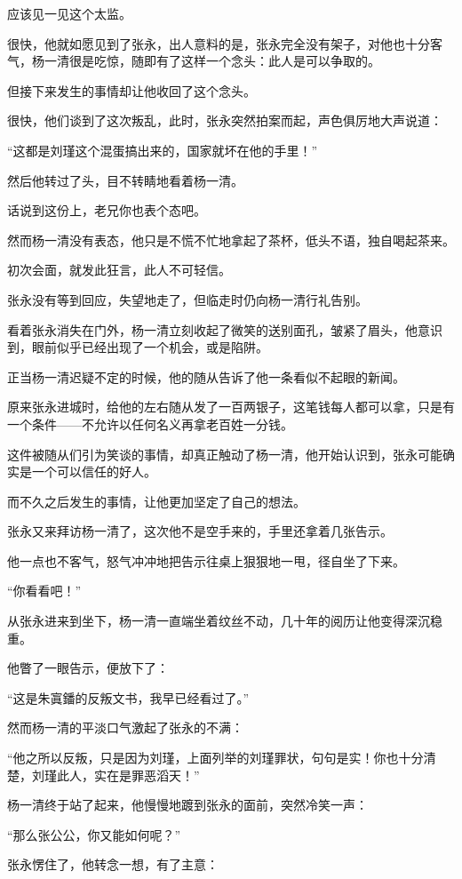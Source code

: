 \begin{multicols}{\theparacolNo}
		应该见一见这个太监。

		很快，他就如愿见到了张永，出人意料的是，张永完全没有架子，对他也十分客气，杨一清很是吃惊，随即有了这样一个念头：此人是可以争取的。

		但接下来发生的事情却让他收回了这个念头。

		很快，他们谈到了这次叛乱，此时，张永突然拍案而起，声色俱厉地大声说道：

		“这都是刘瑾这个混蛋搞出来的，国家就坏在他的手里！”

		然后他转过了头，目不转睛地看着杨一清。

		话说到这份上，老兄你也表个态吧。

		然而杨一清没有表态，他只是不慌不忙地拿起了茶杯，低头不语，独自喝起茶来。

		初次会面，就发此狂言，此人不可轻信。

		张永没有等到回应，失望地走了，但临走时仍向杨一清行礼告别。

		看着张永消失在门外，杨一清立刻收起了微笑的送别面孔，皱紧了眉头，他意识到，眼前似乎已经出现了一个机会，或是陷阱。

		正当杨一清迟疑不定的时候，他的随从告诉了他一条看似不起眼的新闻。

		原来张永进城时，给他的左右随从发了一百两银子，这笔钱每人都可以拿，只是有一个条件——不允许以任何名义再拿老百姓一分钱。

		这件被随从们引为笑谈的事情，却真正触动了杨一清，他开始认识到，张永可能确实是一个可以信任的好人。

		而不久之后发生的事情，让他更加坚定了自己的想法。

		张永又来拜访杨一清了，这次他不是空手来的，手里还拿着几张告示。

		他一点也不客气，怒气冲冲地把告示往桌上狠狠地一甩，径自坐了下来。

		“你看看吧！”

		从张永进来到坐下，杨一清一直端坐着纹丝不动，几十年的阅历让他变得深沉稳重。

		他瞥了一眼告示，便放下了：

		“这是朱寘鐇的反叛文书，我早已经看过了。”

		然而杨一清的平淡口气激起了张永的不满：

		“他之所以反叛，只是因为刘瑾，上面列举的刘瑾罪状，句句是实！你也十分清楚，刘瑾此人，实在是罪恶滔天！”

		杨一清终于站了起来，他慢慢地踱到张永的面前，突然冷笑一声：

		“那么张公公，你又能如何呢？”

		张永愣住了，他转念一想，有了主意：


\end{multicols}
